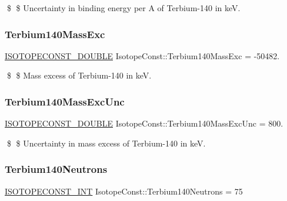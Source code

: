 \$ \$ Uncertainty in binding energy per A of Terbium-\/140 in keV. \mbox{\label{group___isotope_const-_terbium-_tb140_gaea66b36cd134805b76803815e67db5ce}} 
\subsubsection{\texorpdfstring{Terbium140\+Mass\+Exc}{Terbium140MassExc}}
{\footnotesize\ttfamily \mbox{\hyperlink{group___isotope_const-_macros_ga8f45a7272ce02c0b4c65c44636ed719a}{I\+S\+O\+T\+O\+P\+E\+C\+O\+N\+S\+T\+\_\+\+D\+O\+U\+B\+LE}} Isotope\+Const\+::\+Terbium140\+Mass\+Exc = -\/50482.}

\$ \$ Mass excess of Terbium-\/140 in keV. \mbox{\label{group___isotope_const-_terbium-_tb140_gaf319b720fe681cdd552b9f57c701de2e}} 
\subsubsection{\texorpdfstring{Terbium140\+Mass\+Exc\+Unc}{Terbium140MassExcUnc}}
{\footnotesize\ttfamily \mbox{\hyperlink{group___isotope_const-_macros_ga8f45a7272ce02c0b4c65c44636ed719a}{I\+S\+O\+T\+O\+P\+E\+C\+O\+N\+S\+T\+\_\+\+D\+O\+U\+B\+LE}} Isotope\+Const\+::\+Terbium140\+Mass\+Exc\+Unc = 800.}

\$ \$ Uncertainty in mass excess of Terbium-\/140 in keV. \mbox{\label{group___isotope_const-_terbium-_tb140_ga2e2a0bf1b7802a56d9a545f94b380e60}} 
\subsubsection{\texorpdfstring{Terbium140\+Neutrons}{Terbium140Neutrons}}
{\footnotesize\ttfamily \mbox{\hyperlink{group___isotope_const-_macros_ga5f18360b3e99483a35c32d789e62621c}{I\+S\+O\+T\+O\+P\+E\+C\+O\+N\+S\+T\+\_\+\+I\+NT}} Isotope\+Const\+::\+Terbium140\+Neutrons = 75}

